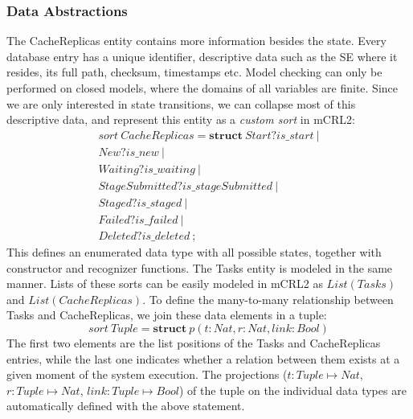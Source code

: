 \documentclass[10pt,conference]{IEEEtran}
\begin{document}
\subsubsection{Data Abstractions}
The CacheReplicas entity contains more information besides the state.
Every database entry has a unique identifier, descriptive data such as 
the SE where it resides, its full path, checksum, timestamps etc. 
Model checking can only be performed on closed models, where the domains
of all variables are finite. Since we are only interested in state transitions,
we can collapse most of this descriptive data, and represent this entity as a 
\textit{custom sort} in mCRL2:
\begin{displaymath}
\begin{align*}
sort\ CacheReplicas = \textbf{struct}\ Start?is\_start\ | \\
			  New?is\_new\ |  \\
		    Waiting?is\_waiting\ | \\
          StageSubmitted?is\_stageSubmitted\ | \\ 
		      Staged?is\_staged\ | \\
		      Failed?is\_failed\ | \\
		  Deleted?is\_deleted\ ;
\end{align*}
\end{displaymath}
This defines an enumerated data type with all possible states, together with constructor and recognizer functions.
The Tasks entity is modeled in the same manner. Lists of these sorts can be easily modeled 
in mCRL2 as \begin{math}List(Tasks) \end{math} and 
\begin{math}List(CacheReplicas) \end{math}.
To define the many-to-many relationship between Tasks and CacheReplicas,
we join these data elements in a tuple:
\begin{displaymath}sort \ Tuple = \textbf{struct}\ p(t:Nat,r:Nat,link:Bool)
\end{displaymath}
The first two elements are the list positions of the Tasks and CacheReplicas
entries, while the last one indicates whether a relation between
them exists at a given moment of the system execution. The projections 
($t:Tuple\mapsto Nat$, $r:Tuple\mapsto Nat$, $link:Tuple\mapsto Bool$)
of the tuple on the individual data types are automatically defined with the above
statement.
\end{document}

